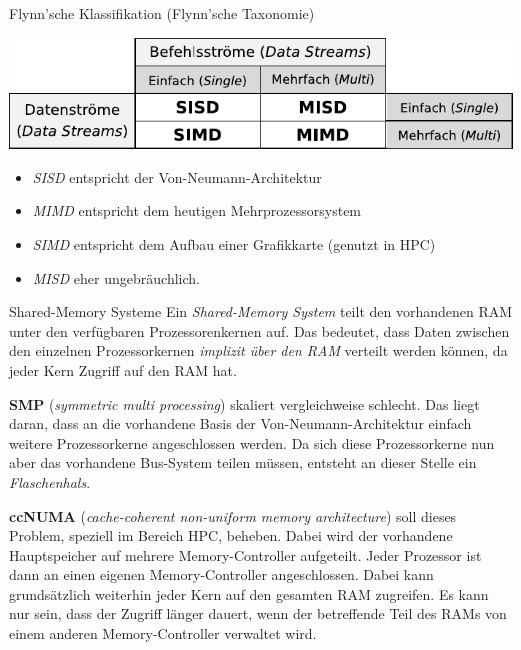 \begin{defi}{Flynn'sche Klassifikation (Flynn'sche Taxonomie)}
    \begin{center}
        \includegraphics[]{images/flynn.pdf}
    \end{center}

    \begin{itemize}
        \item \emph{SISD} entspricht der Von-Neumann-Architektur
        \item \emph{MIMD} entspricht dem heutigen Mehrprozessorsystem
        \item \emph{SIMD} entspricht dem Aufbau einer Grafikkarte (genutzt in HPC)
        \item \emph{MISD} eher ungebräuchlich.
    \end{itemize}
\end{defi}

\begin{defi}{Shared-Memory Systeme}
    Ein \emph{Shared-Memory System} teilt den vorhandenen RAM unter den verfügbaren Prozessorenkernen auf.
    Das bedeutet, dass Daten zwischen den einzelnen Prozessorkernen \emph{implizit über den RAM} verteilt werden können, da
    jeder Kern Zugriff auf den RAM hat.

    \textbf{SMP} (\emph{symmetric multi processing}) skaliert vergleichweise schlecht.
    Das liegt daran, dass an die vorhandene Basis der Von-Neumann-Architektur einfach
    weitere Prozessorkerne angeschlossen werden. Da sich diese Prozessorkerne
    nun aber das vorhandene Bus-System teilen müssen, entsteht an dieser Stelle ein
    \emph{Flaschenhals}.

    \textbf{ccNUMA} (\emph{cache-coherent non-uniform memory architecture}) soll dieses Problem, speziell im Bereich HPC, beheben.
    Dabei wird der vorhandene Hauptspeicher auf mehrere Memory-Controller aufgeteilt.
    Jeder Prozessor ist dann an einen eigenen Memory-Controller angeschlossen.
    Dabei kann grundsätzlich weiterhin jeder Kern auf den gesamten RAM zugreifen.
    Es kann nur sein, dass der Zugriff länger dauert, wenn der betreffende Teil des RAMs von einem anderen Memory-Controller verwaltet wird.
\end{defi}

